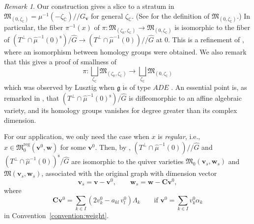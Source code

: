 \documentclass[12pt]{amsart}
\def\Bbb{\mathbb}
\def\frak{\mathfrak}
\theoremstyle{definition}
\theoremstyle{remark}
\newtheorem{Remark}[equation]{Remark}
\numberwithin{equation}{subsection}
\newcommand{\C}{{\Bbb C}}
\newcommand{\R}{{\Bbb R}}
\newcommand{\M}{{\frak M}} %
\newcommand{\Mreg}{{\frak M_0^{\operatorname{reg}}}}
\newcommand{\dslash}{/\!\!/} %
\newcommand{\bv}{{\mathbf v}} %
\newcommand{\bw}{{\mathbf w}} %
\newcommand{\bC}{{\mathbf C}} %
\begin{document}
\begin{Remark}
Our construction gives a slice to a stratum in $\M_{(0,\zeta_\C)}
= \mu^{-1}(-\zeta_\C)\dslash G_\bv$ for general $\zeta_\C$.
(See \cite[p.371 and Theorem~3.1]{Na-quiver} for the definition of
$\M_{(0,\zeta_\C)}$.)
%
In particular, the fiber $\pi^{-1}(x)$ of $\pi\colon
\M_{(\zeta_\R,\zeta_\C)}\to \M_{(0,\zeta_\C)}$ is isomorphic to the
fiber of 
\(
   \left( T^\perp\cap \widehat\mu^{-1}(0)^{\operatorname{s}}\right)/
      \widehat G 
    \to 
   \left( T^\perp\cap \widehat\mu^{-1}(0)\right)\dslash\widehat G
\)
at $0$. This is a refinement of \cite[6.10]{Na-quiver}, where an
isomorphism between homology groups were obtained.
%
We also remark that this gives a proof of smallness of
\[
   \pi\colon \bigsqcup_{\zeta_\C} \M_{(\zeta_\R,\zeta_\C)}
     \to \bigsqcup_{\zeta_\C}\M_{(0,\zeta_\C)}
\]
which was observed by Lusztig when $\mathfrak g$ is of type $ADE$
\cite{Lu-small}.
%
An essential point is, as remarked in \cite[6.11]{Na-quiver}, that 
\(
   \left( T^\perp\cap \widehat\mu^{-1}(0)^{\operatorname{s}}\right)/
      \widehat G 
\)
is diffeomorphic to an affine algebraic variety, and its homology
groups vanishes for degree greater than its complex dimension.
\end{Remark}

For our application, we only need the case when $x$ is {\it regular},
i.e., $x\in\Mreg(\bv^0,\bw)$ for some $\bv^0$.  Then, by
\cite[p.392]{Na-quiver}, \( \left(T^\perp\cap
  \widehat\mu^{-1}(0)\right) \dslash \widehat G \) and \(
\left(T^\perp\cap \widehat\mu^{-1}(0)\right)^{\operatorname{s}}/
\widehat G \) are isomorphic to the quiver varieties
$\M_0(\bv_s,\bw_s)$ and $\M(\bv_s,\bw_s)$, associated with the
original graph with dimension vector
\begin{equation*}
   \bv_s = \bv - \bv^0, \qquad
   \bw_s = \bw - \bC\bv^0,
\end{equation*}
where 
\begin{equation*}
   \bC\bv^0 
   = \sum_{k\in I} \left(2 v^0_k - a_{kl}\, v^0_l\right)\Lambda_k
   \qquad
   \text{if }\bv^0 = \sum_{k\in I} v^0_k \alpha_k
\end{equation*}
in Convention~\ref{convention:weight}.
\end{document}
